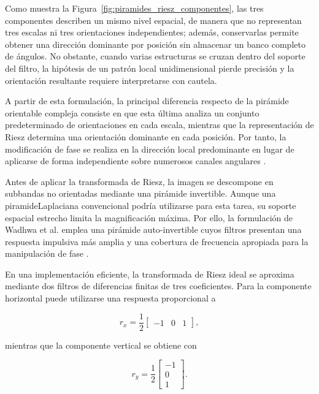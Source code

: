 Como muestra la Figura~\ref{fig:piramides_riesz_componentes}, las tres componentes describen un mismo nivel espacial, de manera que no representan tres escalas ni tres orientaciones independientes; además, conservarlas permite obtener una dirección dominante por posición sin almacenar un banco completo de ángulos. No obstante, cuando varias estructuras se cruzan dentro del soporte del filtro, la hipótesis de un patrón local unidimensional pierde precisión y la orientación resultante requiere interpretarse con cautela.

A partir de esta formulación, la principal diferencia respecto de la pirámide orientable compleja consiste en que esta última analiza un conjunto predeterminado de orientaciones en cada escala, mientras que la representación de Riesz determina una orientación dominante en cada posición. Por tanto, la modificación de fase se realiza en la dirección local predominante en lugar de aplicarse de forma independiente sobre numerosos canales angulares \cite{wadhwa2014riesz}.

Antes de aplicar la transformada de Riesz, la imagen se descompone en subbandas no orientadas mediante una pirámide invertible. Aunque una \gls{piramideLaplaciana} convencional podría utilizarse para esta tarea, su soporte espacial estrecho limita la magnificación máxima. Por ello, la formulación de Wadhwa et al. emplea una pirámide auto-invertible cuyos filtros presentan una respuesta impulsiva más amplia y una cobertura de frecuencia apropiada para la manipulación de fase \cite{wadhwa2014riesz}.

En una implementación eficiente, la transformada de Riesz ideal se aproxima mediante dos filtros de diferencias finitas de tres coeficientes. Para la componente horizontal puede utilizarse una respuesta proporcional a

\begin{equation}
    r_x=
    \frac{1}{2}
    \begin{bmatrix}
        -1 & 0 & 1
    \end{bmatrix},
    \label{eq:filtro_riesz_horizontal}
\end{equation}

mientras que la componente vertical se obtiene con

\begin{equation}
    r_y=
    \frac{1}{2}
    \begin{bmatrix}
        -1\\
        0\\
        1
    \end{bmatrix}.
    \label{eq:filtro_riesz_vertical}
\end{equation}

